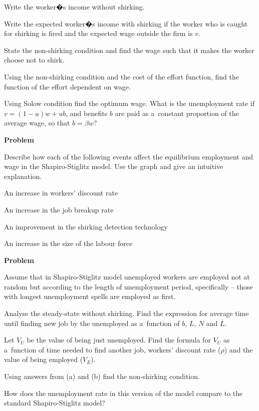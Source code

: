 \documentclass[a4paper, notitlepage, 11pt]{article}
\newcounter{zadlicz}[section]%
\newcommand{\tytul}[2]{\setcounter{equation}{0}\addtocounter{zadlicz}{1}\vspace{\abovedisplayskip}\noindent\textbf{#1\ \thezadlicz #2}}%
\begin{document}
\begin{wylicz}
\item Write the worker�s income without shirking.
\item Write the expected worker�s income with shirking if the worker who is caught for shirking is fired and the expected wage outside the firm is $v$.
\item State the non-shirking condition and find the wage such that it makes the worker choose not to shirk.
\item Using the non-shirking condition and the cost of the effort function, find the function of the effort dependent on wage.
\item Using Solow condition find the optimum wage. What is the unemployment rate if $v=(1-u)w+ub$, and benefits $b$ are paid as a~constant proportion of the average wage, so that $b=\beta w$?
\end{wylicz}

\tytul{Problem}{}

\noindent%
Describe how each of the following events affect the equilibrium employment and wage in the Shapiro-Stiglitz model. Use the graph and give an intuitive explanation.

\begin{wylicz}
 \item An increase in workers' discount rate
 \item An increase in the job breakup rate
 \item An improvement in the shirking detection technology
 \item An increase in the size of the labour force
\end{wylicz}

\tytul{Problem}{}

\noindent%
Assume that in Shapiro-Stiglitz model unemployed workers are employed not at random but according to the length of unemployment period, specifically -- those with longest unemployment spells are employed as first.

\begin{wylicz}
 \item Analyse the steady-state without shirking. Find the expression for average time until finding new job by the unemployed as a~function of $b$, $L$, $N$ and  $\overline L$.
 \item Let $V_U$ be the value of being just unemployed. Find the formula for $V_U$ as a~function of time needed to find another job, workers' discount rate ($\rho$) and the value of being employed ($V_E$).
 \item Using answers from (a) and (b) find the non-shirking condition.
 \item How does the unemployment rate in this version of the model compare to the standard Shapiro-Stiglitz model?
\end{wylicz}
\end{document}

